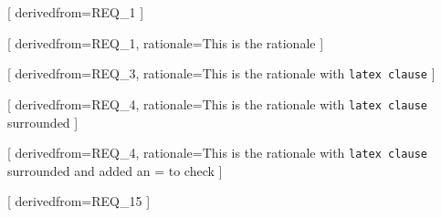 


[
  derivedfrom=REQ\_1
]

[
  derivedfrom=REQ\_1,
  rationale=This is the rationale
]

[
  derivedfrom=REQ\_3,
  rationale=This is the rationale with \texttt{latex clause}
]

[
  derivedfrom=REQ\_4,
  rationale={This is the rationale with \texttt{latex clause} surrounded}
]

[
  derivedfrom=REQ\_4,
  rationale={This is the rationale with \texttt{latex clause} surrounded and added an = to check}
]

[
  derivedfrom=REQ\_15
]
